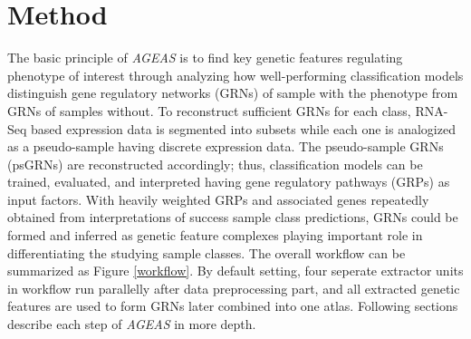 \documentclass[fleqn,10pt]{wlscirep}
\begin{document}
\section*{Method}
  \label{method}
  The basic principle of \emph{AGEAS} is to find key genetic features regulating phenotype of interest through analyzing how well-performing classification models distinguish gene regulatory networks (GRNs) of sample with the phenotype from GRNs of samples without.
  To reconstruct sufficient GRNs for each class, RNA-Seq based expression data is segmented into subsets while each one is analogized as a pseudo-sample having discrete expression data.
  The pseudo-sample GRNs (psGRNs) are reconstructed accordingly; thus, classification models can be trained, evaluated, and interpreted having gene regulatory pathways (GRPs) as input factors.
  With heavily weighted GRPs and associated genes repeatedly obtained from interpretations of success sample class predictions, GRNs could be formed and inferred as genetic feature complexes playing important role in differentiating the studying sample classes.
  The overall workflow can be summarized as Figure \ref{workflow}.
  By default setting, four seperate extractor units in workflow run parallelly after data preprocessing part, and all extracted genetic features are used to form GRNs later combined into one atlas.
  Following sections describe each step of \emph{AGEAS} in more depth.
\end{document}
